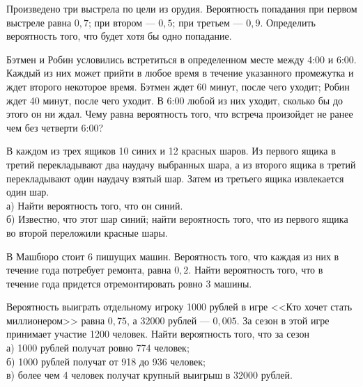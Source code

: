 \newpage\setcounter{zad}{0}



\begin{zkrW}{20}\noindent 
	Произведено три выстрела по цели из орудия. Вероятность попадания при первом выстреле равна $0{,}7$; при втором --- $0{,}5$; при третьем --- $0{,}9$. Определить вероятность того, что будет хотя бы одно попадание.
 
\end{zkrW}

\begin{zkrW}{20}\noindent 
	Бэтмен и Робин условились встретиться в определенном месте между 4:00 и 6:00. Каждый из них может прийти в любое время в течение указанного промежутка и ждет второго некоторое время. Бэтмен ждет 60 минут, после чего уходит; Робин ждет 40 минут, после чего уходит. В 6:00 любой из них уходит, сколько бы до этого он ни ждал. Чему равна вероятность того, что встреча произойдет не ранее чем без четверти 6:00?
 
\end{zkrW}

\begin{zkrW}{20}\noindent 
	В каждом из трех ящиков 10 синих и 12 красных шаров. Из первого ящика в третий перекладывают два наудачу выбранных шара, а из второго ящика в третий перекладывают один наудачу взятый шар. Затем из третьего ящика извлекается один шар. \\ \indent а) Найти вероятность того, что он синий. \\ \indent б) Известно, что этот шар синий; найти вероятность того, что из первого ящика во второй переложили красные шары.
 
\end{zkrW}

\begin{zkrW}{20}\noindent 
	В Машбюро стоит 6 пишущих машин. Вероятность того, что каждая из них в течение года потребует ремонта, равна $0{,}2$. Найти вероятность того, что в течение года придется отремонтировать ровно 3 машины.
 
\end{zkrW}

\begin{zkrW}{20}\noindent 
	Вероятность выиграть отдельному игроку 1000 рублей в игре <<Кто хочет стать миллионером>> равна $0{,}75$, а 32000 рублей --- $0{,}005$. За сезон в этой игре принимает участие 1200 человек. Найти вероятность того, что за сезон \\ \indent а) 1000 рублей получат ровно 774 человек; \\ \indent б) 1000 рублей получат от 918 до 936 человек; \\ \indent в) более чем 4 человек получат крупный выигрыш в 32000 рублей.
 
\end{zkrW}


